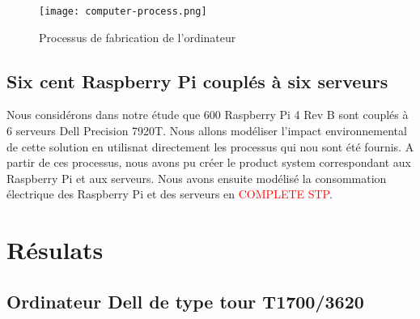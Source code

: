 \documentclass[12pt,a4paper]{paper}
\begin{document}
\begin{figure}[h!]%
    \centering
    \texttt{[image: computer-process.png]}
    \caption{Processus de fabrication de l'ordinateur}
    \label{fig:computer-process}
\end{figure}

\subsection{Six cent Raspberry Pi couplés à six serveurs}
Nous considérons dans notre étude que 600 Raspberry Pi 4 Rev B sont couplés à 6 serveurs Dell Precision 7920T. Nous allons modéliser l'impact environnemental de cette solution en utilisnat directement les processus qui nou sont été fournis. A partir de ces processus, nous avons pu créer le product system correspondant aux Raspberry Pi et aux serveurs. Nous avons ensuite modélisé la consommation électrique des Raspberry Pi et des serveurs en \textcolor{red}{COMPLETE STP}.

\section{Résulats}
\subsection{Ordinateur Dell de type tour T1700/3620}
\label{sec:computer}
\end{document}
